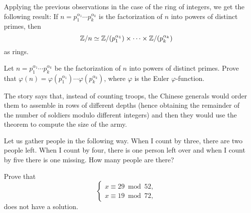 Applying the previous observations in the case of the ring of integers, we get the following result: If $n=p_1^{\alpha_1}\cdots p_k^{\alpha_k}$ is the factorization 
of $n$ into powers of distinct primes, then 
\[
\mathbb{Z}/n\simeq \mathbb{Z}/(p_1^{\alpha_1})\times\cdots \times \mathbb{Z}/(p_k^{\alpha_k})
\]
as rings. 

\begin{bonus}
    Let $n=p_1^{\alpha_1}\cdots p_k^{\alpha_k}$ be the factorization 
    of $n$ into powers of distinct primes. Prove that 
    $\varphi(n)=\varphi(p_1^{\alpha_1})\cdots \varphi(p_k^{\alpha_k})$, where $\varphi$ is the Euler $\varphi$-function. 
\end{bonus}


%

The story says that, 
instead of counting troops, 
the Chinese generals would order them to 
assemble in rows of different depths 
(hence obtaining the remainder of the number 
of soldiers modulo different integers) and then they 
would use the theorem to 
compute the size of the army.

\begin{bonus}
\label{xca:gather_people}
	Let us gather people in the following way. When I 
	count by three, there are two people left. 	When I count by four, 
	there is one person left over and when I count by five there is
	one missing. How many people are there?
\end{bonus}

\begin{bonus}
\label{xca:no_solution}
	Prove that 
	\[
	\begin{cases}
		x\equiv 29\bmod 52,\\
		x\equiv 19\bmod 72,
		\end{cases}
	\]
	does not have a solution.
\end{bonus}

